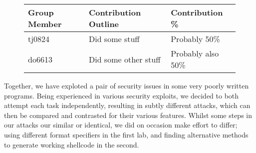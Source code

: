 \begin{figure}[h]
\centering
\begin{tabular}{|l|l|l|}
\hline
{\bf Group Member} & {\bf Contribution Outline} & {\bf Contribution \%} \\
\hline
tj0824 & Did some stuff & Probably 50\% \\
do6613 & Did some other stuff & Probably also 50\% \\
\hline
\end{tabular}
\end{figure}

Together, we have exploted a pair of security issues in some very poorly written programs. Being experienced in various
security exploits, we decided to both attempt each task independently, resulting in subtly different attacks, which can
then be compared and contrasted for their various features. Whilst some steps in our attacks our similar or identical,
we did on occasion make effort to differ; using different format specifiers in the first lab, and finding alternative
methods to generate working shellcode in the second.

